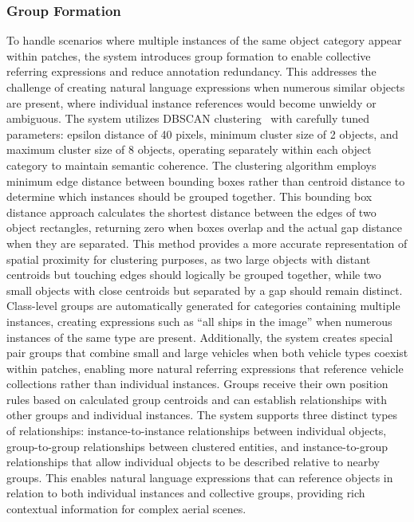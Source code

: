 \subsubsection{Group Formation}
To handle scenarios where multiple instances of the same object category appear within patches, the system introduces group formation to enable collective referring expressions and reduce annotation redundancy. This addresses the challenge of creating natural language expressions when numerous similar objects are present, where individual instance references would become unwieldy or ambiguous. The system utilizes DBSCAN clustering~\cite{dbscan} with carefully tuned parameters: epsilon distance of 40 pixels, minimum cluster size of 2 objects, and maximum cluster size of 8 objects, operating separately within each object category to maintain semantic coherence. The clustering algorithm employs minimum edge distance between bounding boxes rather than centroid distance to determine which instances should be grouped together. This bounding box distance approach calculates the shortest distance between the edges of two object rectangles, returning zero when boxes overlap and the actual gap distance when they are separated. This method provides a more accurate representation of spatial proximity for clustering purposes, as two large objects with distant centroids but touching edges should logically be grouped together, while two small objects with close centroids but separated by a gap should remain distinct. Class-level groups are automatically generated for categories containing multiple instances, creating expressions such as ``all ships in the image'' when numerous instances of the same type are present. Additionally, the system creates special pair groups that combine small and large vehicles when both vehicle types coexist within patches, enabling more natural referring expressions that reference vehicle collections rather than individual instances. Groups receive their own position rules based on calculated group centroids and can establish relationships with other groups and individual instances. The system supports three distinct types of relationships: instance-to-instance relationships between individual objects, group-to-group relationships between clustered entities, and instance-to-group relationships that allow individual objects to be described relative to nearby groups. This enables natural language expressions that can reference objects in relation to both individual instances and collective groups, providing rich contextual information for complex aerial scenes.

